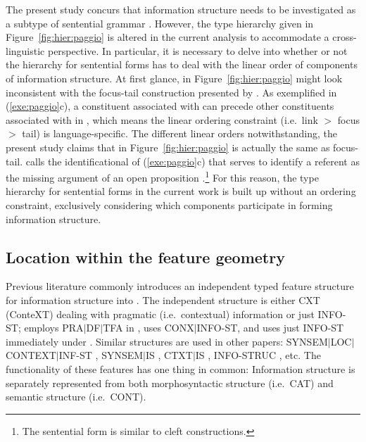 The present study concurs that information structure needs to be
investigated as a subtype of sentential grammar
\citep{lambrecht:96,engdahl:vallduvi:96,paggio:09}. However, the type
hierarchy given in Figure~\ref{fig:hier:paggio} is altered in the
current analysis to accommodate a cross-linguistic perspective.  In
particular, it is necessary to delve into whether or not the hierarchy
for sentential forms has to deal with the linear order of components
of information structure.  At first glance,  in
Figure~\ref{fig:hier:paggio} might look inconsistent with the
focus-tail construction presented by
\citeauthor{engdahl:vallduvi:96}. As exemplified in
(\ref{exe:paggio}c), a constituent associated with  can
precede other constituents associated with  in
, which means the linear ordering constraint (i.e.\ link
\ensuremath{>} focus \ensuremath{>} tail) is language-specific.  The
different linear orders notwithstanding, the present study claims that
 in Figure~\ref{fig:hier:paggio} is actually the same as
focus-tail.  \citet{paggio:09} calls the identificational 
of (\ref{exe:paggio}c)  that serves to identify a
referent as the missing argument of an open proposition
\citep[122]{lambrecht:96}.\footnote{The  sentential form
  is similar to cleft constructions.} For this reason,
the type hierarchy for sentential forms in the current work is built
up without an ordering constraint, exclusively considering which
components participate in forming information structure.






\subsection{Location within the feature geometry}
\label{8:ssec:hpsg:context}

Previous literature commonly introduces an independent typed feature
structure for information structure into . The independent
structure is either CXT (ConteXT) dealing with pragmatic
(i.e.\ contextual) information or just INFO-ST; \citet{chang:02}
employs PRA{$\mid$}DF{$\mid$}TFA in ,
\citet{ohtani:matsumoto:04} uses CONX{$\mid$}INFO-ST, and
\citet{kim:07} uses just INFO-ST immediately under . Similar
structures are used in other papers:
SYNSEM{$\mid$}LOC{$\mid$}CONTEXT{$\mid$}INF-ST
\citep{yoshimoto:etal:06}, SYNSEM{$\mid$}IS \citep{bildhauer:cook:10},
CTXT{$\mid$}IS \citep{bjerre:11}, INFO-STRUC
\citep{dekuthy:meurers:11}, etc.  The functionality of these features
has one thing in common: Information structure is separately
represented from both morphosyntactic structure (i.e.\ CAT) and
semantic structure (i.e.\ CONT).




